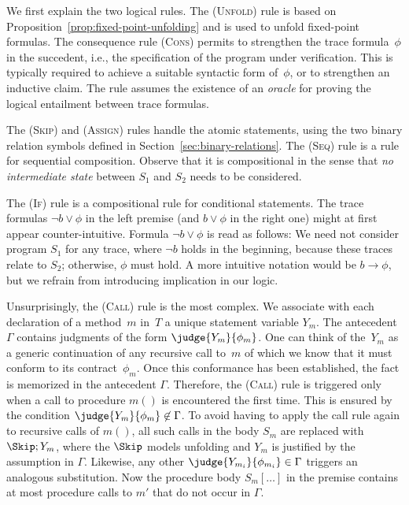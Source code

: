 \documentclass[a4paper,numberwithinsect]{lipics-v2021}
\newcommand{\rh}[1]{\marginpar{RH: #1}}
\begin{document}
We first explain the two logical rules.
%
The (\textsc{Unfold}) rule is based on
Proposition~\ref{prop:fixed-point-unfolding} and is used to unfold
fixed-point formulas.
%
The consequence rule (\textsc{Cons}) permits to strengthen the trace
formula~$\phi$ in the succedent, i.e., the specification of the
program under verification. This is typically required to achieve a
suitable syntactic form of~$\phi$, or to strengthen an inductive
claim.  The rule assumes the existence of an \emph{oracle} for proving
the logical entailment between trace formulas.

The (\textsc{Skip}) and (\textsc{Assign}) rules handle the atomic
statements, using the two binary relation symbols defined in
Section~\ref{sec:binary-relations}.
%
The (\textsc{Seq}) rule is a rule for sequential composition. Observe
that it is compositional in the sense that \emph{no intermediate
  state} between $S_1$ and $S_2$ needs to be considered.

The (\textsc{If}) rule is a compositional rule for conditional
statements. The trace formulas $\lnot b\lor\phi$ in the left premise
(and $b\lor\phi$ in the right one) might at first appear
counter-intuitive. Formula $\lnot b\lor\phi$ is read as follows: We
need not consider program $S_1$ for any trace, where $\lnot b$ holds
in the beginning, because these traces relate to $S_2$; otherwise,
$\phi$ must hold. A more intuitive notation would be
$b\rightarrow\phi$, but we refrain from introducing implication in our
logic.

Unsurprisingly, the (\textsc{Call}) rule is the most complex.  We
associate with each declaration of a method~$m$ in~$T$ a unique
statement variable $Y_m$. The antecedent $\Gamma$ contains judgments
of the form $\judge{Y_m}{\phi_m}$.  One can think of the~$Y_m$ as a
generic continuation of any recursive call to~$m$ of which we know
that it must conform to its contract~$\phi_m$. Once this conformance
has been established, the fact is memorized in the antecedent
$\Gamma$. Therefore, the (\textsc{Call}) rule is triggered only when a
call to procedure $m()$ is encountered the first time.  This is
ensured by the condition $\judge{Y_m}{\phi_m}\not\in\Gamma$. To avoid
having to apply the call rule again to recursive calls of $m()$, all
such calls in the body $S_m$ are replaced with $\Skip;Y_m$, where the
$\Skip$ models unfolding and $Y_m$ is justified by the assumption in
$\Gamma$. Likewise, any other $\judge{Y_{m_i}}{\phi_{m_i}}\in\Gamma$
triggers an analogous substitution. Now the procedure body
$S_m[\ldots]$ in the premise contains at most procedure calls to $m'$
that do not occur in $\Gamma$.
\end{document}
